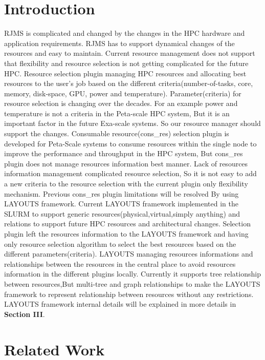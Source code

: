 \documentclass[conference]{IEEEtran}
\begin{document}
\section{Introduction}
RJMS is complicated and changed by the changes in the HPC hardware and application requirements. RJMS has to support dynamical changes of the resources and easy to maintain. Current resource management does not support that flexibility and resource selection is not getting complicated for the future HPC.  Resource selection plugin managing HPC resources and allocating best resources to the user's job based on the different criteria(number-of-tasks, core, memory, disk-space, GPU, power and temperature). Parameter(criteria) for resource selection is changing over the decades. For an example power and temperature is not a criteria in the Peta-scale HPC system, But it is an important factor in the future Exa-scale systems. So our resource manager should support the changes. Consumable resource(cons\_res) selection plugin is developed for Peta-Scale systems to consume resources within the single node to improve the performance and throughput in the HPC system, But cons\_res plugin does not manage resources information best manner. Lack of resources information management complicated resource selection, So it is not easy to add a new criteria to the resource selection with the current plugin only flexibility mechanism. Previous cons\_res plugin limitations will be resolved By using LAYOUTS framework. Current LAYOUTS framework implemented in the SLURM to support generic resources(physical,virtual,simply anything) and relations to support future HPC resources and architectural changes. Selection plugin left the resources information to the LAYOUTS framework and having only resource selection algorithm to select the best resources based on the different parameters(criteria). LAYOUTS managing resources informations and relationships between the resources in the central place to avoid resources information in the different plugins locally. Currently it supports tree relationship between resources,But multi-tree and graph relationships to make the LAYOUTS framework to represent relationship between resources without  any restrictions. LAYOUTS framework internal details will be explained in more details in \textbf{Section III}.


\section{Related Work}
\label{sec:related_work}
\end{document}
